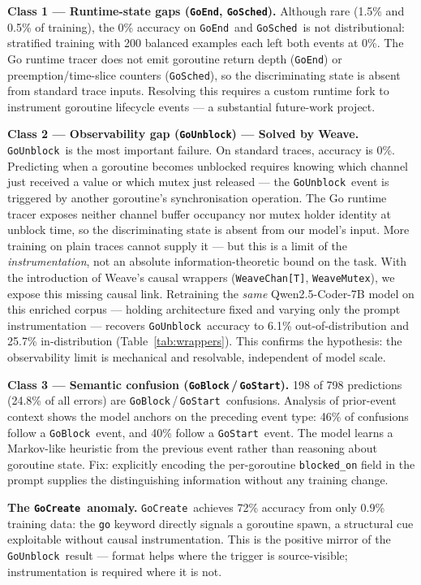 \documentclass[10pt,conference]{IEEEtran}
\newcommand{\eblock}{\texttt{GoBlock}}
\newcommand{\eunblock}{\texttt{GoUnblock}}
\newcommand{\estart}{\texttt{GoStart}}
\newcommand{\ecreate}{\texttt{GoCreate}}
\newcommand{\eend}{\texttt{GoEnd}}
\newcommand{\esched}{\texttt{GoSched}}
\begin{document}
\textbf{Class 1 — Runtime-state gaps (\eend, \esched).}
Although rare (1.5\% and 0.5\% of training), the 0\% accuracy on \eend\ and \esched\ is not distributional: stratified training with 200 balanced examples each left both events at 0\%.
The Go runtime tracer does not emit goroutine return depth (\eend) or preemption/time-slice counters (\esched), so the discriminating state is absent from standard trace inputs.
Resolving this requires a custom runtime fork to instrument goroutine lifecycle events — a substantial future-work project.

\textbf{Class 2 — Observability gap (\eunblock) — Solved by Weave.}
\eunblock\ is the most important failure.
On standard traces, accuracy is 0\%.
Predicting when a goroutine becomes unblocked requires knowing which
channel just received a value or which mutex just released — the
\eunblock\ event is triggered by another goroutine's synchronisation
operation.
The Go runtime tracer exposes neither channel buffer occupancy nor
mutex holder identity at unblock time, so the discriminating state is
absent from our model's input.
More training on plain traces cannot supply it — but this is a limit of
the \emph{instrumentation}, not an absolute information-theoretic
bound on the task.
With the introduction of Weave's causal wrappers (\texttt{WeaveChan[T]}, \texttt{WeaveMutex}),
we expose this missing causal link. Retraining the \emph{same} Qwen2.5-Coder-7B model on this enriched corpus — holding architecture fixed and varying only the prompt instrumentation — recovers \eunblock\ accuracy to 6.1\% out-of-distribution and 25.7\% in-distribution (Table~\ref{tab:wrappers}).
This confirms the hypothesis: the observability limit is mechanical and resolvable, independent of model scale.

\textbf{Class 3 — Semantic confusion (\eblock\,/\,\estart).}
198 of 798 predictions (24.8\% of all errors) are \eblock\,/\,\estart\
confusions.
Analysis of prior-event context shows the model anchors on the
preceding event type: 46\% of confusions follow a \eblock\ event, and
40\% follow a \estart\ event.
The model learns a Markov-like heuristic from the previous event rather
than reasoning about goroutine state.
Fix: explicitly encoding the per-goroutine \texttt{blocked\_on} field
in the prompt supplies the distinguishing information without any
training change.

\textbf{The \ecreate\ anomaly.}
\ecreate\ achieves 72\% accuracy from only 0.9\% training data: the \texttt{go} keyword directly signals a goroutine spawn, a structural cue exploitable without causal instrumentation. This is the positive mirror of the \eunblock\ result — format helps where the trigger is source-visible; instrumentation is required where it is not.
\end{document}
